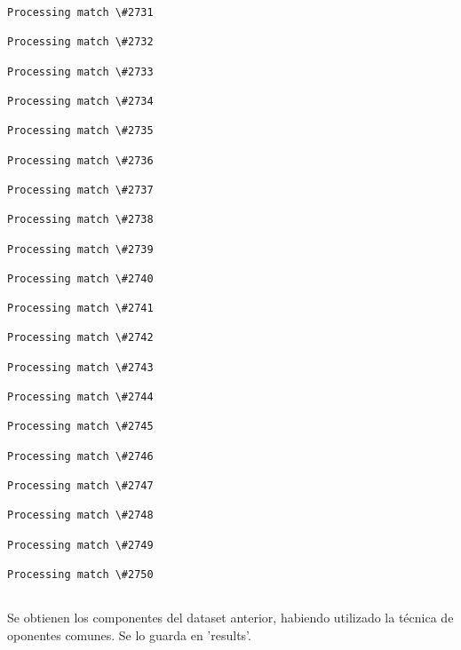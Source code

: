 \documentclass[11pt]{article}
\begin{document}
\begin{Verbatim}[commandchars=\\\{\}]
Processing match \#2731

Processing match \#2732

Processing match \#2733

Processing match \#2734

Processing match \#2735

Processing match \#2736

Processing match \#2737

Processing match \#2738

Processing match \#2739

Processing match \#2740

Processing match \#2741

Processing match \#2742

Processing match \#2743

Processing match \#2744

Processing match \#2745

Processing match \#2746

Processing match \#2747

Processing match \#2748

Processing match \#2749

Processing match \#2750


    \end{Verbatim}

    Se obtienen los componentes del dataset anterior, habiendo utilizado la
técnica de oponentes comunes. Se lo guarda en 'results'.
\end{document}
